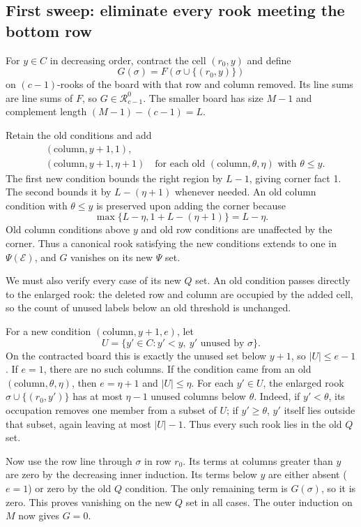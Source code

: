 \documentclass[11pt,a4paper,oneside,openany]{book}
\theoremstyle{definition}\newtheorem{definition}[theorem]{Definition}
\theoremstyle{remark}\newtheorem{remark}[theorem]{Remark}
\numberwithin{equation}{chapter}
\begin{document}
\subsection{First sweep: eliminate every rook meeting the bottom row}
For $y\in C$ in decreasing order, contract the cell $(r_0,y)$ and define
\[G(\sigma)=F(\sigma\cup\{(r_0,y)\})
\]
on $(c-1)$-rooks of the board with that row and column removed. Its line sums are line sums of $F$, so $G\in \mathcal R_{c-1}^{0}$. The smaller board has size $M-1$ and complement length $(M-1)-(c-1)=L$.

Retain the old conditions and add
\begin{align*}
&(\mathrm{column},y+1,1),\\
&(\mathrm{column},y+1,\eta+1)
\quad\text{for each old }(\mathrm{column},\theta,\eta)\text{ with }\theta\le y.
\end{align*}
The first new condition bounds the right region by $L-1$, giving corner fact 1. The second bounds it by $L-(\eta+1)$ whenever needed. An old column condition with $\theta\le y$ is preserved upon adding the corner because
\[\max\{L-\eta,1+L-(\eta+1)\}=L-\eta.
\]
Old column conditions above $y$ and old row conditions are unaffected by the corner. Thus a canonical rook satisfying the new conditions extends to one in $\Psi(\mathcal E)$, and $G$ vanishes on its new $\Psi$ set.

We must also verify every case of its new $Q$ set. An old condition passes directly to the enlarged rook: the deleted row and column are occupied by the added cell, so the count of unused labels below an old threshold is unchanged.

For a new condition $(\mathrm{column},y+1,e)$, let
\[U=\{y'\in C:y'<y,\ y'\text{ unused by }\sigma\}.
\]
On the contracted board this is exactly the unused set below $y+1$, so $|U|\le e-1$. If $e=1$, there are no such columns. If the condition came from an old $(\mathrm{column},\theta,\eta)$, then $e=\eta+1$ and $|U|\le \eta$. For each $y'\in U$, the enlarged rook $\sigma\cup\{(r_0,y')\}$ has at most $\eta-1$ unused columns below $\theta$. Indeed, if $y'<\theta$, its occupation removes one member from a subset of $U$; if $y'\ge\theta$, $y'$ itself lies outside that subset, again leaving at most $|U|-1$. Thus every such rook lies in the old $Q$ set.

Now use the row line through $\sigma$ in row $r_0$. Its terms at columns greater than $y$ are zero by the decreasing inner induction. Its terms below $y$ are either absent ($e=1$) or zero by the old $Q$ condition. The only remaining term is $G(\sigma)$, so it is zero. This proves vanishing on the new $Q$ set in all cases. The outer induction on $M$ now gives $G=0$.
\end{document}
